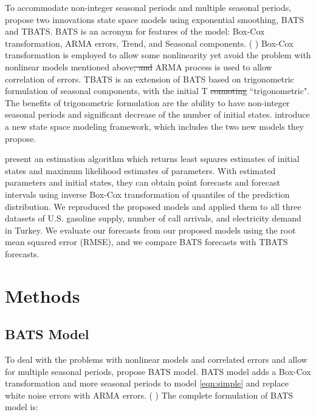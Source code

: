 \documentclass{uwstat572}
\newcommand{\vmdel}[1]{\sout{#1}}
\newcommand{\vmadd}[1]{\textbf{\color{red}{#1}}}
\newcommand{\vmcomment}[1]{({\color{blue}{VM's comment:}} \textbf{\color{blue}{#1}})}
\begin{document}
To accommodate non-integer seasonal periods and multiple seasonal periods, \citet{de2011forecasting} propose two innovations state space models using exponential smoothing, BATS\vmadd{,} and TBATS. BATS is an acronym for features of the model: Box-Cox transformation, ARMA errors, Trend, and Seasonal components. 
\vmcomment{Define ARMA abbreviation.}
Box-Cox transformation is employed to allow some nonlinearity\vmadd{,} yet \vmadd{to} avoid the problem with nonlinear models mentioned above\vmadd{.}\vmdel{, and} 
\vmadd{An} ARMA process is used to allow \vmadd{for} correlation of errors. TBATS is an extension of BATS \vmadd{that is} based on trigonometric formulation of seasonal components, with the initial T \vmdel{connoting} \vmadd{standing for} ``trigonometric". The benefits of trigonometric formulation are the ability to have non-integer seasonal periods and significant decrease of the number of initial states. \citet{de2011forecasting} introduce a new state space modeling framework, which includes the two new models they propose.  

\citet{de2011forecasting} present an estimation algorithm which returns least squares estimates of initial states and maximum likelihood estimates of parameters. With estimated parameters and initial states, they can obtain point forecasts and forecast intervals using inverse Box-Cox transformation of quantiles of the prediction distribution. We reproduced the proposed models and  applied them to all three datasets of U.S. gasoline supply, number of call arrivals, and electricity demand in Turkey. We evaluate our forecasts from our proposed models using the root mean squared error (RMSE), and we compare BATS forecasts with TBATS forecasts.

\section{Methods}
\subsection{BATS Model}
\hspace{4ex}To deal with the problems with nonlinear models and correlated errors and allow for multiple seasonal periods, \citet{de2011forecasting} propose \vmadd{a} BATS model. 
BATS model adds a Box-Cox transformation and more seasonal periods to model \ref{eqn:simple} and replace white noise errors with ARMA errors. 
\vmcomment{The first two sentences repeat what you already said in the intro. Do you really need them here?}
The complete formulation of BATS model is:  
\end{document}
